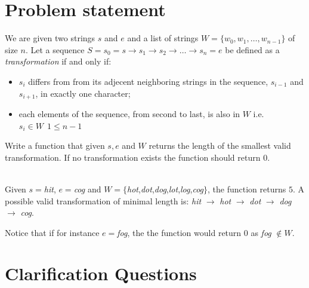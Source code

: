 \section{Problem statement}
\begin{exercise}
\label{example:word_ladder:exercice1}
We are given two strings $s$ and $e$ and a list of strings $W=\{w_0, w_1,\ldots,w_{n-1}\}$ of size $n$.
Let a sequence $S=s_0 = s \rightarrow s_1 \rightarrow s_2 \rightarrow \ldots \rightarrow s_n = e$ be defined as a \textit{transformation} if and only if:
\begin{itemize}
    \item $s_i$ differs from from its adjecent neighboring strings in the sequence, $s_{i-1}$ and $s_{i+1}$, in exactly one character;
    \item each elements of the sequence, from second to last, is also in $W$ i.e. $s_i \in W \: \: 1 \leq n-1 $
\end{itemize}
Write a function that given $s,e$ and $W$ returns the length of the smallest valid transformation.
If no transformation exists the function should return $0$.

    \begin{example}
        \label{example:word_ladder:example1}
        \hfill \\
        Given $s=$\textit{hit},  $e=$\textit{cog} and $W=\{$\textit{hot},\textit{dot},\textit{dog},\textit{lot},\textit{log},\textit{cog}$\}$, the function returns $5$.
        A possible valid transformation  of minimal length is: \textit{hit} $\rightarrow$ \textit{hot} $\rightarrow$ \textit{dot} $\rightarrow$ \textit{dog} $\rightarrow$ \textit{cog}.

        Notice that if for instance $e=$\textit{fog}, the the function would return $0$ as \textit{fog} $\notin W$.
    \end{example}

\end{exercise}

\section{Clarification Questions}

